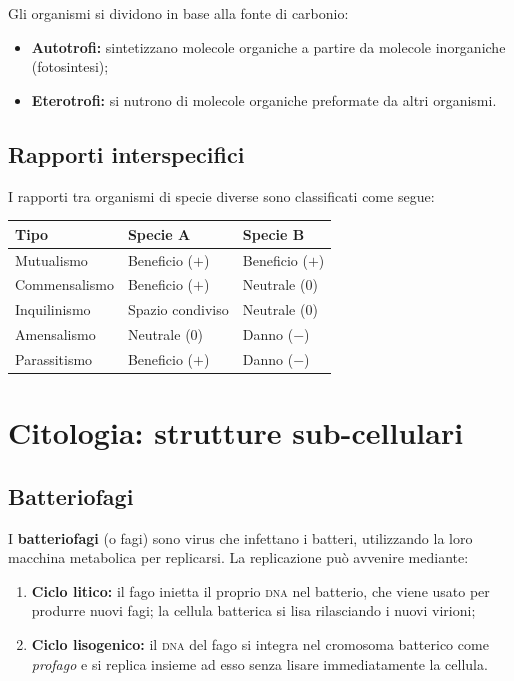\documentclass[11pt,a4paper,openright,twoside]{book}
\theoremstyle{definition}
\theoremstyle{plain}
\theoremstyle{remark}
\newcommand{\dna}{\textsc{dna}}
\begin{document}
Gli organismi si dividono in base alla fonte di carbonio:
\begin{itemize}
  \item \textbf{Autotrofi:} sintetizzano molecole organiche a partire da molecole inorganiche (fotosintesi);
  \item \textbf{Eterotrofi:} si nutrono di molecole organiche preformate da altri organismi.
\end{itemize}

\subsection{Rapporti interspecifici}

I rapporti tra organismi di specie diverse sono classificati come segue:

\begin{center}
\begin{tabular}{lll}
\toprule
\textbf{Tipo} & \textbf{Specie A} & \textbf{Specie B} \\
\midrule
Mutualismo & Beneficio ($+$) & Beneficio ($+$) \\
Commensalismo & Beneficio ($+$) & Neutrale (0) \\
Inquilinismo & Spazio condiviso & Neutrale (0) \\
Amensalismo & Neutrale (0) & Danno ($-$) \\
Parassitismo & Beneficio ($+$) & Danno ($-$) \\
\bottomrule
\end{tabular}
\end{center}

\section{Citologia: strutture sub-cellulari}

\subsection{Batteriofagi}

I \textbf{batteriofagi} (o fagi) sono virus che infettano i batteri, utilizzando la loro macchina metabolica per replicarsi. La replicazione può avvenire mediante:

\begin{enumerate}
  \item \textbf{Ciclo litico:} il fago inietta il proprio \dna{} nel batterio, che viene usato per produrre nuovi fagi; la cellula batterica si lisa rilasciando i nuovi virioni;
  \item \textbf{Ciclo lisogenico:} il \dna{} del fago si integra nel cromosoma batterico come \textit{profago} e si replica insieme ad esso senza lisare immediatamente la cellula.
\end{enumerate}
\end{document}
